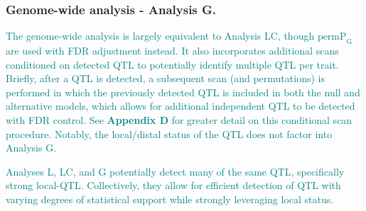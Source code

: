 \documentclass[9pt,twocolumn,twoside]{gsajnl}
\newcommand{\permpg}{\text{permP}_{\text{G}}}
\newcommand{\GKinline}[1]{\textcolor{teal}{#1}}
\begin{document}
\subsubsection{Genome-wide analysis - Analysis G.} 
\GKinline{The genome-wide analysis is largely equivalent to Analysis LC, though $\permpg$ are used with FDR adjustment instead. It also incorporates additional scans conditioned on detected QTL to potentially identify multiple QTL per trait. Briefly, after a QTL is detected, a subsequent scan (and permutations) is performed in which the previously detected QTL is included in both the null and alternative models, which allows for additional independent QTL to be detected with FDR control. See \textbf{Appendix D} for greater detail on this conditional scan procedure. Notably, the local/distal status of the QTL does not factor into Analysis G.}

\GKinline{Analyses L, LC, and G potentially detect many of the same QTL, specifically strong local-QTL. Collectively, they allow for efficient detection of QTL with varying degrees of statistical support while strongly leveraging local status.}




\end{document}
